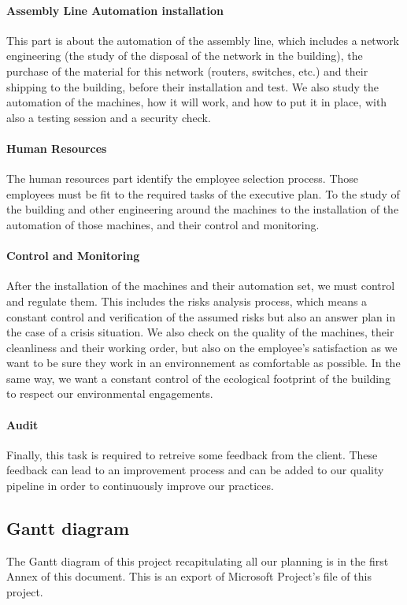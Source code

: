 \paragraph{Assembly Line Automation installation} This part is about the automation of the assembly line, which includes a network engineering (the study of the disposal of the network in the building), the purchase
of the material for this network (routers, switches, etc.) and their shipping to the building, before their installation and test. 
We also study the automation of the machines, how it will work, and how to put it in place, with also a testing session and a security check.

\paragraph{Human Resources} The human resources part identify the employee selection process. Those employees 
must be fit to the required tasks of the executive plan. To the study of the building and other engineering around the machines to the 
installation of the automation of those machines, and their control and monitoring. 

\paragraph{Control and Monitoring} After the installation of the machines and their automation set, we must control and regulate them.
This includes the risks analysis process, which means a constant control and verification of the assumed risks but also an answer plan in the case of a crisis situation. 
We also check on the quality of the machines, their cleanliness and their working order, but also on the employee's satisfaction as we want to be sure they
work in an environnement as comfortable as possible. 
In the same way, we want a constant control of the ecological footprint of the building to respect our environmental engagements.   

\paragraph{Audit} Finally, this task is required to retreive some feedback from the client.
These feedback can lead to an improvement process and can be added to our quality pipeline in order to continuously improve our practices.


\subsection{Gantt diagram}

The Gantt diagram of this project recapitulating all our planning is in the first Annex of this document. This is an export of Microsoft Project's file of this project.